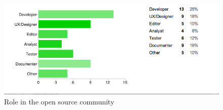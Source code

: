 \begin{figure}[ht!]
\centering
\includegraphics[width=130mm]{chapters/img/contribution_role.png}
\caption{Role in the open source community}
\label{fig:contribution_role}
\end{figure}


